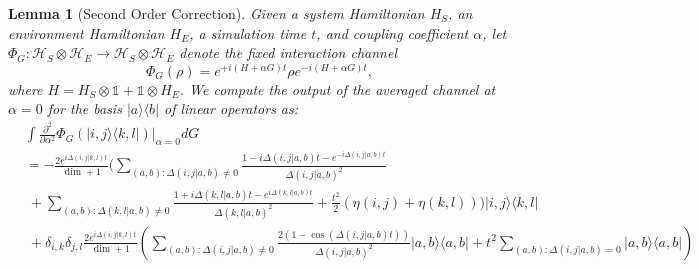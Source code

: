 \documentclass{article}
\newtheorem{lemma}[theorem]{Lemma}
\newcommand{\ketbra}[2]{| #1\rangle\! \langle #2|}
\newcommand{\parens}[1]{\left( #1 \right)}
\newcommand{\hilb}{\mathcal{H}}
\newcommand{\identity}{\mathds{1}}
\begin{document}
\begin{lemma}[Second Order Correction] \label{lem:the_double_duhamel}
    Given a system Hamiltonian $H_{S}$, an environment Hamiltonian $H_{E}$, a simulation time $t$, and coupling coefficient $\alpha$, let $\Phi_G : \hilb_S \otimes \hilb_E \to \hilb_S \otimes \hilb_E$ denote the fixed interaction channel 
    \begin{equation}
        \Phi_G(\rho) = e^{+i (H + \alpha G)t} \rho e^{-i (H + \alpha G)t},
    \end{equation}
    where $H = H_S \otimes \identity + \identity \otimes H_E$. We compute the output of the averaged channel at $\alpha = 0$ for the basis $\ketbra{a}{b}$ of linear operators as:
 \begin{align}
     &\int \frac{\partial^2}{\partial \alpha^2} \Phi_G(\ketbra{i,j}{k,l})\bigg|_{\alpha = 0} dG \\
     &= -\frac{2  e^{i \Delta(i,j|k,l) t}}{\dim + 1} \bigg(\sum_{(a,b): \Delta(i,j|a,b) \neq 0} \frac{1 - i \Delta(i,j|a,b)t - e^{-i \Delta(i,j|a,b) t}}{\Delta(i,j|a,b)^2} \nonumber \\
     &~+ \sum_{(a,b): \Delta(k,l|a,b) \neq 0} \frac{1 + i \Delta(k,l|a,b) t - e^{i \Delta(k,l|a,b) t}}{\Delta(k,l|a,b)^2} + \frac{t^2}{2}(\eta(i,j) + \eta(k,l)) \bigg) \ketbra{i,j}{k,l} \nonumber \\
    &~ +\delta_{i,k} \delta_{j,l} \frac{2 e^{i \Delta(i,j|k,l)t}}{\dim+1} \parens{ \sum_{(a,b): \Delta(i,j|a,b) \neq 0 } \frac{2(1- \cos (\Delta(i,j|a,b)t))}{\Delta(i,j|a,b)^2} \ketbra{a,b}{a,b} + t^2 \sum_{(a,b) : \Delta(i,j|a,b) = 0} \ketbra{a,b}{a,b}}
 \end{align}
\end{lemma}
\end{document}
